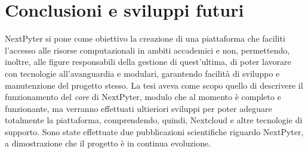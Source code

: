 \chapter{Conclusioni e sviluppi futuri}
NextPyter si pone come obiettivo la creazione di una piattaforma che faciliti l'accesso alle risorse computazionali in ambiti accademici e non, permettendo, inoltre, alle figure responsabili della gestione di quest'ultima, di poter lavorare con tecnologie all'avanguardia e modulari, garantendo facilità di sviluppo e manutenzione del progetto stesso.
\newline
La tesi aveva come scopo quello di descrivere il funzionamento del \textit{core} di NextPyter, modulo che al momento è completo e funzionante, ma verranno effettuati ultieriori sviluppi per poter adeguare totalmente la piattaforma, comprendendo, quindi, Nextcloud e altre tecnologie di supporto.
\newline
Sono state effettuate due pubblicazioni scientifiche\cite{nextpyter-work-1}\cite{nextpyter-work-2} riguardo NextPyter, a dimostrazione che il progetto è in continua evoluzione.